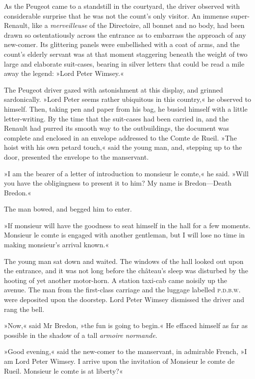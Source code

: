 As the Peugeot came to a standstill in the courtyard, the driver observed with considerable surprise that he was not the count's only visitor. An immense super-Renault, like a \textit{merveilleuse} of the Directoire, all bonnet and no body, had been drawn so ostentatiously across the entrance as to embarrass the approach of any new-comer. Its glittering panels were embellished with a coat of arms, and the count's elderly servant was at that moment staggering beneath the weight of two large and elaborate suit-cases, bearing in silver letters that could be read a mile away the legend: »Lord Peter Wimsey.«

The Peugeot driver gazed with astonishment at this display, and grinned sardonically. »Lord Peter seems rather ubiquitous in this country,« he observed to himself. Then, taking pen and paper from his bag, he busied himself with a little letter-writing. By the time that the suit-cases had been carried in, and the Renault had purred its smooth way to the outbuildings, the document was complete and enclosed in an envelope addressed to the Comte de Rueil. »The hoist with his own petard touch,« said the young man, and, stepping up to the door, presented the envelope to the manservant.

»I am the bearer of a letter of introduction to monsieur le comte,« he said. »Will you have the obligingness to present it to him? My name is Bredon—Death Bredon.«

The man bowed, and begged him to enter.

»If monsieur will have the goodness to seat himself in the hall for a few moments. Monsieur le comte is engaged with another gentleman, but I will lose no time in making monsieur's arrival known.«

The young man sat down and waited. The windows of the hall looked out upon the entrance, and it was not long before the château's sleep was disturbed by the hooting of yet another motor-horn. A station taxi-cab came noisily up the avenue. The man from the first-class carriage and the luggage labelled \textsc{p.d.b.w.} were deposited upon the doorstep. Lord Peter Wimsey dismissed the driver and rang the bell.

»Now,« said Mr Bredon, »the fun is going to begin.« He effaced himself as far as possible in the shadow of a tall \textit{armoire normande}.

»Good evening,« said the new-comer to the manservant, in admirable French, »I am Lord Peter Wimsey. I arrive upon the invitation of Monsieur le comte de Rueil. Monsieur le comte is at liberty?«


